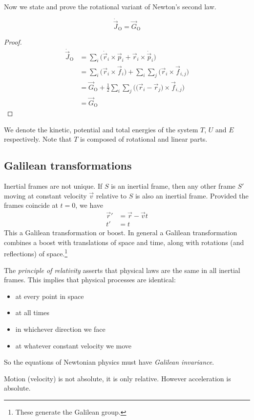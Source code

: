 \documentclass[a4paper]{article}
\begin{document}
Now we state and prove the rotational variant of Newton's second law.

\begin{thm}
  $$\dot{\vec{J}}_{\textrm{O}} = \vec{G}_{\textrm{O}}$$
\end{thm}
\begin{proof}
  \begin{align*}
    \dot{\vec{J}}_{\textrm{O}} &= \sum_i \big( \dot{\vec{r}}_i \times \vec{p}_i + \vec{r}_i \times \dot{\vec{p}}_i \big) \\
                                &= \sum_i \big( \vec{r}_i \times \vec{f}_i \big) + \sum_i \sum_j \big( \vec{r}_i \times \vec{f}_{i,j} \big) \\
                                &= \vec{G}_{\textrm{O}} + \frac{1}{2} \sum_i \sum_j \big( \big( \vec{r}_i - \vec{r}_j \big) \times \vec{f}_{i,j} \big) \\
                                &= \vec{G}_{\textrm{O}}
  \end{align*}
\end{proof}

We denote the kinetic, potential and total energies of the system $T$, $U$ and $E$ respectively. Note that $T$ is composed of rotational and linear parts.

\subsection{Galilean transformations}
Inertial frames are not unique. If $S$ is an inertial frame, then any other frame $S'$ moving at constant velocity $\vec{v}$ relative to $S$ is also an inertial frame. Provided the frames coincide at $t=0$, we have
\begin{align*}
  \vec{r}' &= \vec{r} - \vec{v}t \\
  t' &= t
\end{align*}
This a Galilean transformation or boost. In general a Galilean transformation combines a boost with translations of space and time, along with rotations (and reflections) of space.\footnote{These generate the Galilean group.}


\begin{law}
  The \emph{principle of relativity} asserts that physical laws are the same in all inertial frames. This implies that physical processes are identical:
  \begin{itemize}
  \item at every point in space
  \item at all times
  \item in whichever direction we face
  \item at whatever constant velocity we move
  \end{itemize}
  So the equations of Newtonian physics must have \emph{Galilean invariance}.
\end{law}
Motion (velocity) is not absolute, it is only relative. However acceleration is absolute.
\end{document}
